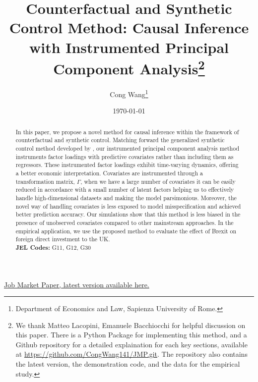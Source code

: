 \documentclass[12pt]{article}
\begin{document}
\begin{titlepage}
    \title{Counterfactual and Synthetic Control Method: Causal Inference with Instrumented Principal Component Analysis\thanks{We thank Matteo Lacopini, Emanuele Bacchiocchi for helpful discussion on this paper. There is a Python Package for implementing this method, and a Github repository for a detailed explaination for each key sections, available at \href{https://github.com/CongWang141/JMP.git}{https://github.com/CongWang141/JMP.git}. The repository also contains the latest version, the demonstration code, and the data for the empirical study.}} 

    \author{Cong Wang\thanks{Department of Economics and Law, Sapienza University of Rome.}}
    \date{\today}
    \maketitle
    \begin{center}
        \href{https://github.com/CongWang141/JMP/blob/main/latex/main.pdf}{Job Market Paper, latest version available here.}
    \end{center}

    \begin{abstract}
        \noindent In this paper, we propose a novel method for causal inference within the framework of counterfactual and synthetic control. Matching forward the generalized synthetic control method developed by \cite{xu2017generalized}, our instrumented principal component analysis method instruments factor loadings with predictive covariates rather than including them as regressors. These instrumented factor loadings exhibit time-varying dynamics, offering a better economic interpretation. Covariates are instrumented through a transformation matrix, $\Gamma$, when we have a large number of covariates it can be easily reduced in accordance with a small number of latent factors helping us to effectively handle high-dimensional datasets and making the model parsimonious. Moreover, the novel way of handling covariates is less exposed to model misspecification and achieved better prediction accuracy. Our simulations show that this method is less biased in the presence of unobserved covariates compared to other mainstream approaches. In the empirical application, we use the proposed method to evaluate the effect of Brexit on foreign direct investment to the UK.\\

        \noindent\textbf{JEL Codes:} G11, G12, G30\\
        \bigskip
    \end{abstract}

    \setcounter{page}{0}
    \thispagestyle{empty}
\end{titlepage}
\end{document}
